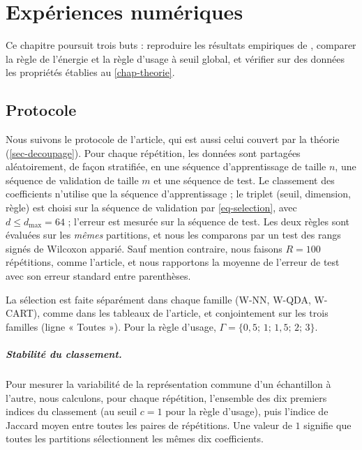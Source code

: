 \chapter{Expériences numériques}\label{chap-experiences}

\newcommand{\JacEnergieUne}{0{,}33}
\newcommand{\JacUsageUne}{1{,}00}
\newcommand{\NbCoeffsPhoneme}{256}


Ce chapitre poursuit trois buts : reproduire les résultats empiriques de \citet{berlinet2008functional}, comparer la règle de l'énergie et la règle d'usage à seuil global, et vérifier sur des données les propriétés établies au \cref{chap-theorie}.

\section{Protocole}\label{sec-protocole}

Nous suivons le protocole de l'article, qui est aussi celui couvert par la théorie (\cref{sec-decoupage}). Pour chaque répétition, les données sont partagées aléatoirement, de façon stratifiée, en une séquence d'apprentissage de taille $n$, une séquence de validation de taille $m$ et une séquence de test. Le classement des coefficients n'utilise que la séquence d'apprentissage ; le triplet (seuil, dimension, règle) est choisi sur la séquence de validation par \eqref{eq-selection}, avec $d\le d_{\max}=64$ ; l'erreur est mesurée sur la séquence de test. Les deux règles sont évaluées sur les \emph{mêmes} partitions, et nous les comparons par un test des rangs signés de Wilcoxon apparié. Sauf mention contraire, nous faisons $R=100$ répétitions, comme l'article, et nous rapportons la moyenne de l'erreur de test avec son erreur standard entre parenthèses.

La sélection est faite séparément dans chaque famille (W-NN, W-QDA, W-CART), comme dans les tableaux de l'article, et conjointement sur les trois familles (ligne « Toutes »). Pour la règle d'usage, $\Gamma=\{0{,}5;\,1;\,1{,}5;\,2;\,3\}$.

\paragraph{Stabilité du classement.} Pour mesurer la variabilité de la représentation commune d'un échantillon à l'autre, nous calculons, pour chaque répétition, l'ensemble des dix premiers indices du classement (au seuil $c=1$ pour la règle d'usage), puis l'indice de Jaccard moyen entre toutes les paires de répétitions. Une valeur de $1$ signifie que toutes les partitions sélectionnent les mêmes dix coefficients.


